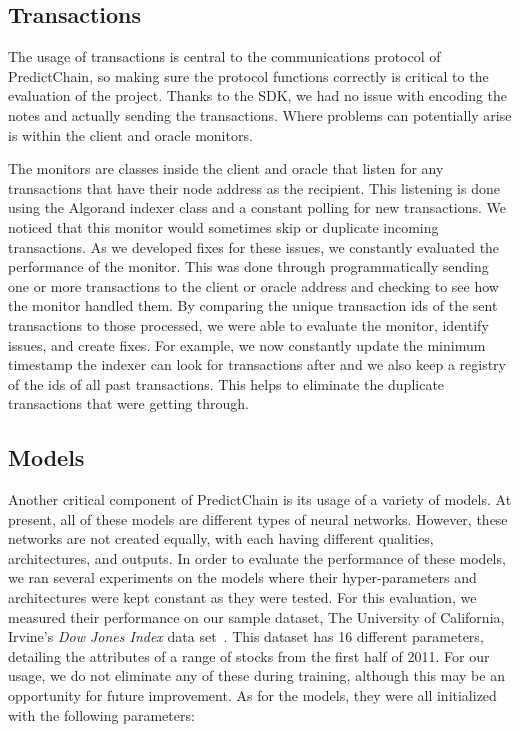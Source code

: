 \documentclass{article}
\begin{document}
    \subsection{Transactions}

    The usage of transactions is central to the communications protocol of PredictChain, so making sure the protocol
    functions correctly is critical to the evaluation of the project.  Thanks to the SDK, we had no issue with encoding the
    notes and actually sending the transactions.  Where problems can potentially arise is within the
    client and oracle monitors.

    The monitors are classes inside the client and oracle that listen for any transactions that have their node address
    as the recipient.  This listening is done using the Algorand indexer class and a constant polling for new transactions.
    We noticed that this monitor would sometimes skip or duplicate incoming transactions.  As we developed fixes for
    these issues, we constantly evaluated the performance of the monitor.  This was done through programmatically sending
    one or more transactions to the client or oracle address and checking to see how the monitor handled them.  By comparing
    the unique transaction ids of the sent transactions to those processed, we were able to evaluate the monitor,
    identify issues, and create fixes. For example, we now constantly update the minimum timestamp the indexer can look
    for transactions after and we also keep a registry of the ids of all past transactions.  This helps to eliminate
    the duplicate transactions that were getting through.

    \subsection{Models}

    Another critical component of PredictChain is its usage of a variety of models.  At present, all of these models
    are different types of neural networks.  However, these networks are not created equally, with each having different
    qualities, architectures, and outputs.  In order to evaluate the performance of these models, we ran several experiments
    on the models where their hyper-parameters and architectures were kept constant as they were tested.  For this
    evaluation, we measured their performance on our sample dataset, The University of California, Irvine's \textit{Dow Jones
    Index} data set~\cite{dowJones}.  This dataset has 16 different parameters, detailing the attributes of a range of
    stocks from the first half of 2011.  For our usage, we do not eliminate any of these during training, although this
    may be an opportunity for future improvement.  As for the models, they were all initialized with the following parameters:
\end{document}
